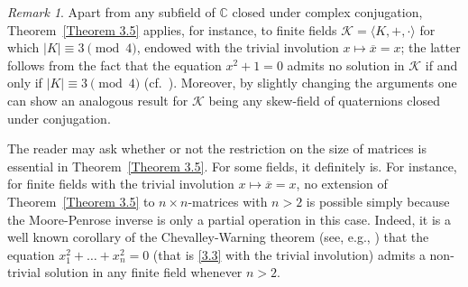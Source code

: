 \documentclass[11pt,reqno]{amsart}
\numberwithin{equation}{section}
\def\bb{\mathbb}
\theoremstyle{remark}
\newtheorem{Rmk}{Remark}[section]
\def\ol{\overline}
\begin{document}
\begin{Rmk}\label{remark on MP inverse}
Apart from any subfield of $\bb C$ closed under complex
conjugation, Theorem~\ref{Theorem 3.5} applies, for instance, to
finite fields $\mathcal{K}=\langle K,+,\cdot\rangle$ for which
$|K|\equiv 3\!\pmod{4}$, endowed with the trivial involution
$x\mapsto \ol x=x$; the latter follows from the fact that the
equation $x^2+1=0$ admits no solution in $\mathcal{K}$ if and only
if $|K|\equiv 3\!\pmod{4}$ (cf.\ \cite[Theorem
3.75]{LidlNiederreiter}). Moreover, by slightly changing the
arguments one can show an analogous result for $\mathcal{K}$ being
any skew-field of quaternions closed under conjugation.
\end{Rmk}

The reader may ask whether or not the restriction on the size of
matrices is essential in Theorem~\ref{Theorem 3.5}. For some
fields, it definitely is. For instance, for finite fields with the
trivial involution $x\mapsto \ol x=x$, no extension of
Theorem~\ref{Theorem 3.5} to $n\times n$-matrices with $n>2$ is
possible simply because the Moore-Penrose inverse is only a
partial operation in this case. Indeed, it is a well known
corollary of the Chevalley-Warning theorem (see, e.g.,
\cite[Corollary 2 in \S1.2]{Serre}) that the equation
$x_1^2+\dots+x_n^2=0$ (that is \eqref{3.3} with the trivial
involution) admits a non-trivial solution in any finite field
whenever $n>2$.
\end{document}
